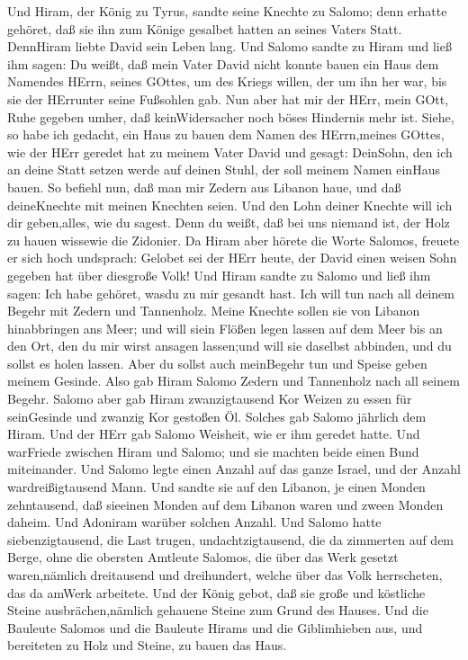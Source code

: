  Und Hiram, der König zu Tyrus, sandte seine Knechte zu
Salomo; denn erhatte gehöret, daß sie ihn zum Könige gesalbet hatten an
seines Vaters Statt. DennHiram liebte David sein Leben lang.
 Und Salomo sandte zu Hiram und ließ ihm sagen: 
Du weißt, daß mein Vater David nicht konnte bauen ein Haus dem Namendes
HErrn, seines GOttes, um des Kriegs willen, der um ihn her war, bis sie
der HErrunter seine Fußsohlen gab.  Nun aber hat mir der
HErr, mein GOtt, Ruhe gegeben umher, daß keinWidersacher noch böses
Hindernis mehr ist.  Siehe, so habe ich gedacht, ein Haus zu
bauen dem Namen des HErrn,meines GOttes, wie der HErr geredet hat zu
meinem Vater David und gesagt: DeinSohn, den ich an deine Statt setzen
werde auf deinen Stuhl, der soll meinem Namen einHaus bauen.
 So befiehl nun, daß man mir Zedern aus Libanon haue, und
daß deineKnechte mit meinen Knechten seien. Und den Lohn deiner Knechte
will ich dir geben,alles, wie du sagest. Denn du weißt, daß bei uns
niemand ist, der Holz zu hauen wissewie die Zidonier.  Da
Hiram aber hörete die Worte Salomos, freuete er sich hoch undsprach:
Gelobet sei der HErr heute, der David einen weisen Sohn gegeben hat über
diesgroße Volk!  Und Hiram sandte zu Salomo und ließ ihm
sagen: Ich habe gehöret, wasdu zu mir gesandt hast. Ich will tun nach
all deinem Begehr mit Zedern und Tannenholz.  Meine Knechte
sollen sie von Libanon hinabbringen ans Meer; und will siein Flößen
legen lassen auf dem Meer bis an den Ort, den du mir wirst ansagen
lassen;und will sie daselbst abbinden, und du sollst es holen lassen.
Aber du sollst auch meinBegehr tun und Speise geben meinem Gesinde.
 Also gab Hiram Salomo Zedern und Tannenholz nach all
seinem Begehr.  Salomo aber gab Hiram zwanzigtausend Kor
Weizen zu essen für seinGesinde und zwanzig Kor gestoßen Öl. Solches gab
Salomo jährlich dem Hiram.  Und der HErr gab Salomo
Weisheit, wie er ihm geredet hatte. Und warFriede zwischen Hiram und
Salomo; und sie machten beide einen Bund miteinander.  Und
Salomo legte einen Anzahl auf das ganze Israel, und der Anzahl
wardreißigtausend Mann.  Und sandte sie auf den Libanon, je
einen Monden zehntausend, daß sieeinen Monden auf dem Libanon waren und
zween Monden daheim. Und Adoniram warüber solchen Anzahl. 
Und Salomo hatte siebenzigtausend, die Last trugen, undachtzigtausend,
die da zimmerten auf dem Berge,  ohne die obersten Amtleute
Salomos, die über das Werk gesetzt waren,nämlich dreitausend und
dreihundert, welche über das Volk herrscheten, das da amWerk arbeitete.
 Und der König gebot, daß sie große und köstliche Steine
ausbrächen,nämlich gehauene Steine zum Grund des Hauses. 
Und die Bauleute Salomos und die Bauleute Hirams und die Giblimhieben
aus, und bereiteten zu Holz und Steine, zu bauen das Haus.

